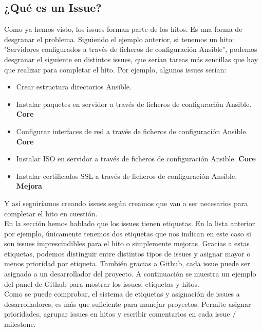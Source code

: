 \subsection{¿Qué es un Issue?}

\begin{text}
	Como ya hemos visto, los issues forman parte de los hitos. Es una forma de desgranar el problema. Siguiendo el ejemplo anterior, si tenemos un hito: "Servidores configurados a través de ficheros de configuración Ansible", podemos desgranar el siguiente en distintos issues, que serían tareas más sencillas que hay que realizar para completar el hito. Por ejemplo, algunos issues serían: 
	\begin{itemize}
		\item Crear estructura directorios Ansible.
		\item Instalar paquetes en servidor a través de ficheros de configuración Ansible. \textbf{Core}
		\item Configurar interfaces de red a través de ficheros de configuración Ansible. \textbf{Core}
		\item Instalar ISO en servidor a través de ficheros de configuración Ansible. \textbf{Core}
		\item Instalar certificados SSL a través de ficheros de configuración Ansible. \textbf{Mejora}
	\end{itemize}
	
	Y así seguiríamos creando issues según creamos que van a ser necesarios para completar el hito en cuestión. \\
	En la sección   hemos hablado que los issues tienen etiquetas. En la lista anterior por ejemplo, únicamente tenemos dos etiquetas que nos indican en este caso si son issues imprescindibles para el hito o simplemente mejoras. Gracias a estas etiquetas, podemos distinguir entre distintos tipos de issues y asignar mayor o menos prioridad por etiqueta. También gracias a Github, cada issue puede ser asignado a un desarrollador del proyecto. A continuación se muestra un ejemplo del panel de Github para mostrar los issues, etiquetas y hitos. \\
	Como se puede comprobar, el sistema de etiquetas y asignación de issues a desarrolladores, es más que suficiente para manejar proyectos. Permite asignar prioridades, agrupar issues en hitos y escribir comentarios en cada issue / milestone. 
	
\end{text}

